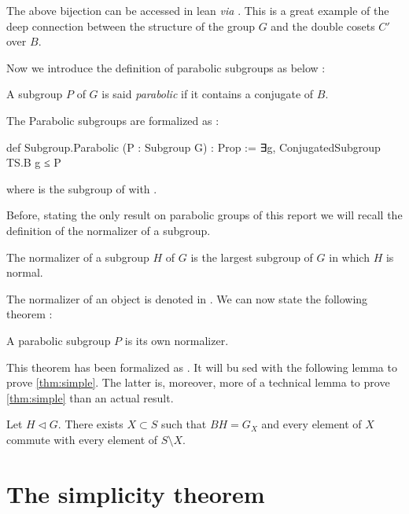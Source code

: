 The above bijection can be accessed in lean \textit{via}  . This is a great example of the deep connection between the structure of the group $G$ and the double cosets $C'$ over $B$.

Now we introduce the definition of parabolic subgroups as below :

\begin{definition}
    A subgroup $P$ of $G$ is said \emph{parabolic} if it contains a conjugate of $B$.
\end{definition}

    The Parabolic subgroups are formalized as :

\begin{leancode}
def Subgroup.Parabolic (P : Subgroup G) : Prop := ∃g, ConjugatedSubgroup TS.B g ≤ P
\end{leancode}
where  is the subgroup of  with  .

Before, stating the only result on parabolic groups of this report we will recall the definition of the normalizer of a subgroup.

\begin{definition}
    The normalizer of a subgroup $H$ of $G$ is the largest subgroup of $G$ in which $H$ is normal.
\end{definition}

The normalizer of an object  is denoted  in \Lean. We can now state the following theorem :
\begin{theoreme}\label{thm:parabolic}
    A parabolic subgroup $P$ is its own normalizer.
\end{theoreme}

This theorem has been formalized as  . It will bu sed with the following lemma to prove \ref{thm:simple}. The latter is, moreover, more of a technical lemma to prove \ref{thm:simple} than an actual result.

\begin{lemme} \label{lem:2}
Let $H \triangleleft G$. There exists $X \subset S$ such that $BH = G_X$ and every element of $X$ commute with every element of $S \setminus X$.
\end{lemme}

\section{The simplicity theorem}%
\label{sec:simple}

